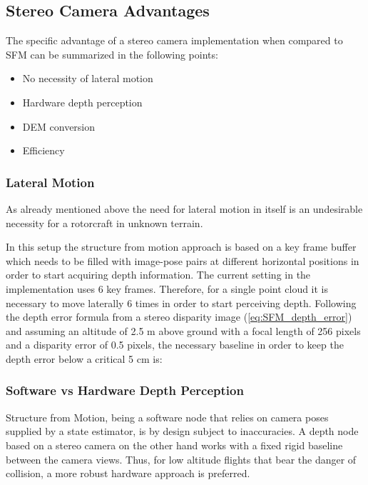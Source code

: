 \subsection{Stereo Camera Advantages}

The specific advantage of a stereo camera implementation when compared to SFM can be summarized in the following points:

\begin{itemize}
    \item No necessity of lateral motion
    \item Hardware depth perception
    \item DEM conversion
    \item Efficiency
\end{itemize}

\subsubsection{Lateral Motion}

As already mentioned above the need for lateral motion in itself is an undesirable necessity for a rotorcraft in unknown terrain. 

In this setup the structure from motion approach is based on a key frame buffer which needs to be filled with image-pose pairs at different horizontal positions in order to start acquiring depth information. The current setting in the implementation \citet{SFM} uses 6 key frames. Therefore, for a single point cloud it is necessary to move laterally 6 times in order to start perceiving depth. Following the depth error formula from a stereo disparity image (\ref{eq:SFM_depth_error}) and assuming an altitude of 2.5 m above ground with a focal length of 256 pixels and a disparity error of 0.5 pixels, the necessary baseline in order to keep the depth error below a critical 5 cm is:

\subsubsection{Software vs Hardware Depth Perception}

Structure from Motion, being a software node that relies on camera poses supplied by a state estimator, is by design subject to inaccuracies. A depth node based on a stereo camera on the other hand works with a fixed rigid baseline between the camera views. Thus, for low altitude flights that bear the danger of collision, a more robust hardware approach is preferred.

